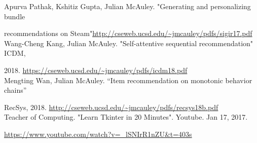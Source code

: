 \documentclass{article}
\begin{document}
\noindent
Apurva Pathak, Kshitiz Gupta, Julian McAuley. "Generating and personalizing bundle\par
\setlength{\parindent}{6ex}
recommendations on Steam"\url{http://cseweb.ucsd.edu/~jmcauley/pdfs/sigir17.pdf}\\

\noindent
Wang-Cheng Kang, Julian McAuley. "Self-attentive sequential recommendation" ICDM, \par
\setlength{\parindent}{6ex}
2018. \url{https://cseweb.ucsd.edu/~jmcauley/pdfs/icdm18.pdf}\\

\noindent
Mengting Wan, Julian McAuley. “Item recommendation on monotonic behavior chains”\par
\setlength{\parindent}{6ex}
RecSys, 2018. \url{http://cseweb.ucsd.edu/~jmcauley/pdfs/recsys18b.pdf}\\

\noindent
Teacher of Computing. "Learn Tkinter in 20 Minutes". Youtube. Jan 17, 2017.\par
\setlength{\parindent}{6ex}
\url{https://www.youtube.com/watch?v=_lSNIrR1nZU&t=403s}\\
    
\end{document}
